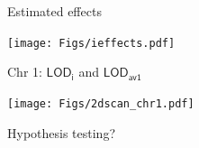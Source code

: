 \documentclass[12pt]{article}
\newcommand{\headsize}{\fontsize{35}{35} \selectfont}
\newcommand{\smallestsize}{\fontsize{18}{22} \selectfont}
\newcommand{\lod}{\text{LOD}}
\begin{document}
\newpage

\headsize \color{myyellow}
\hfill \begin{minipage}{5.75in}
\centering
Estimated effects
\end{minipage}

\vfill

\centerline{\texttt{[image: Figs/ieffects.pdf]}}


\newpage

\headsize \color{myyellow}
\hfill \begin{minipage}{5.75in}
\centering
Chr 1: $\mathsf{\lod_i}$ and $\mathsf{\lod_{av1}}$
\end{minipage}

\vfill

\centerline{\texttt{[image: Figs/2dscan\_chr1.pdf]}}


%
%
%
%
%



\newpage

\headsize \color{myyellow}
\hfill \begin{minipage}{5.75in}
\centering
Hypothesis testing?
\end{minipage}

\vspace{2cm}
\end{document}
